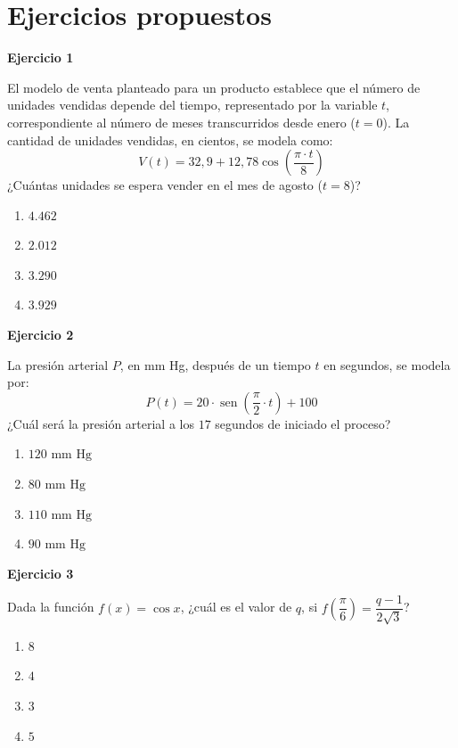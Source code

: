 \documentclass[12pt,letterpaper]{article}
\providecommand{\sen}{\operatorname{sen}}
\begin{document}
\newpage
\section{Ejercicios propuestos}

\textbf{Ejercicio 1}

El modelo de venta planteado para un producto establece que el número de unidades vendidas depende del tiempo, representado por la variable $t$, correspondiente al número de meses transcurridos desde enero ($t=0$). La cantidad de unidades vendidas, en cientos, se modela como:
\[ V(t) = 32{,}9 + 12{,}78\cos\left(\frac{\pi\cdot t}{8}\right) \]
¿Cuántas unidades se espera vender en el mes de agosto ($t=8$)?

\begin{enumerate}[label=\Alph*)]
    \item $4.462$
    \item $2.012$
    \item $3.290$
    \item $3.929$
\end{enumerate}

\vspace{3.5cm}

\textbf{Ejercicio 2}

La presión arterial $P$, en mm Hg, después de un tiempo $t$ en segundos, se modela por:
\[ P(t) = 20\cdot\sen\left(\frac{\pi}{2}\cdot t\right) + 100 \]
¿Cuál será la presión arterial a los $17$ segundos de iniciado el proceso?

\begin{enumerate}[label=\Alph*)]
    \item $120\text{ mm Hg}$
    \item $80\text{ mm Hg}$
    \item $110\text{ mm Hg}$
    \item $90\text{ mm Hg}$
\end{enumerate}

\vspace{3.5cm}

\textbf{Ejercicio 3}

Dada la función $f(x)=\cos x$, ¿cuál es el valor de $q$, si $f\left(\dfrac{\pi}{6}\right)=\dfrac{q-1}{2\sqrt3}$?

\begin{enumerate}[label=\Alph*)]
    \item $8$
    \item $4$
    \item $3$
    \item $5$
\end{enumerate}
\end{document}
